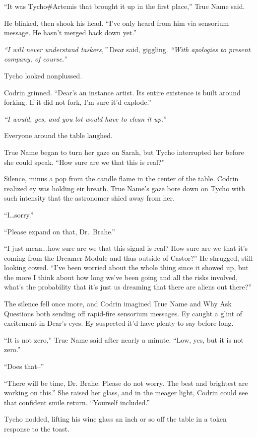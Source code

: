 ``It was Tycho\#Artemis that brought it up in the first place,'' True Name said.

He blinked, then shook his head. ``I've only heard from him via sensorium message. He hasn't merged back down yet.''

\emph{``I will never understand taskers,''} Dear said, giggling. \emph{``With apologies to present company, of course.''}

Tycho looked nonplussed.

Codrin grinned. ``Dear's an instance artist. Its entire existence is built around forking. If it did not fork, I'm sure it'd explode.''

\emph{``I would, yes, and you lot would have to clean it up.''}

Everyone around the table laughed.

True Name began to turn her gaze on Sarah, but Tycho interrupted her before she could speak. ``How sure are we that this is real?''

Silence, minus a pop from the candle flame in the center of the table. Codrin realized ey was holding eir breath. True Name's gaze bore down on Tycho with such intensity that the astronomer shied away from her.

``I\ldots{}sorry.''

``Please expand on that, Dr.~Brahe.''

``I just mean...how sure are we that this signal is real? How sure are we that it's coming from the Dreamer Module and thus outside of Castor?'' He shrugged, still looking cowed. ``I've been worried about the whole thing since it showed up, but the more I think about how long we've been going and all the risks involved, what's the probability that it's just us dreaming that there are aliens out there?''

The silence fell once more, and Codrin imagined True Name and Why Ask Questions both sending off rapid-fire sensorium messages. Ey caught a glint of excitement in Dear's eyes. Ey suspected it'd have plenty to say before long.

``It is not zero,'' True Name said after nearly a minute. ``Low, yes, but it is not zero.''

``Does that--''

``There will be time, Dr. Brahe. Please do not worry. The best and brightest are working on this.'' She raised her glass, and in the meager light, Codrin could see that confident smile return. ``Yourself included.''

Tycho nodded, lifting his wine glass an inch or so off the table in a token response to the toast.

